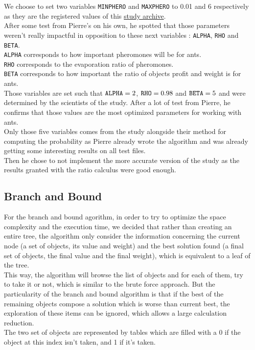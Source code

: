 \documentclass[a4paper, 11pt]{article}
\begin{document}
    We choose to set two variables \verb+MINPHERO+ and \verb+MAXPHERO+ to 0.01 and 6 respectively as they are the registered values of this \href{https://hal.archives-ouvertes.fr/hal-01541529/document}{study archive}.\\
    After some test from Pierre's on his own, he spotted that those parameters weren't really impactful in opposition to these next variables : \verb+ALPHA+, \verb+RHO+ and \verb+BETA+.\\
    \verb+ALPHA+ corresponds to how important pheromones will be for ants.\\
    \verb+RHO+ corresponds to the evaporation ratio of pheromones.\\ 
    \verb+BETA+ corresponds to how important the ratio of objects profit and weight is for ants.\\
    Those variables are set such that $\verb+ALPHA+ = 2$, $\verb+RHO+ = 0.98$ and $\verb+BETA+ = 5$ and were determined by the scientists of the study. After a lot of test from Pierre, he confirms that those values are the most optimized parameters for working with ants.\\
    Only those five variables comes from the study alongside their method for computing the probability as Pierre already wrote the algorithm and was already getting some interesting results on all test files.\\
    Then he chose to not implement the more accurate version of the study as the results granted with the ratio calculus were good enough.
  

    \subsection{Branch and Bound}
    For the branch and bound agorithm, in order to try to optimize the space complexity and the execution time, we decided that rather than creating an entire tree, the algorithm only consider the information concerning the current node (a set of objects, its value and weight) and the best solution found (a final set of objects, the final value and the final weight), which is equivalent to a leaf of the tree.\\
    This way, the algorithm will browse the list of objects and for each of them, try to take it or not, which is similar to the brute force approach. But the particularity of the branch and bound algorithm is that if the best of the remaining objects compose a solution which is worse than current best, the exploration of these items can be ignored, which allows a large calculation reduction.\\
    The two set of objects are represented by tables which are filled with a 0 if the object at this index isn't taken, and 1 if it's taken.
    
\end{document}
